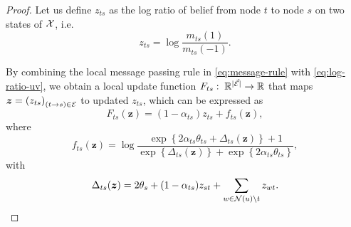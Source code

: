 \begin{proof}
  Let us define $z_{ts}$ as the log ratio of belief from node $t$ to node $s$ on two states of $\mathcal{X}$, i.e.
  \begin{equation}\label{eq:log-ratio-uv}
    z_{ts} = \log\frac{m_{ts}(1)}{m_{ts}(-1)}.
  \end{equation}

  By combining the local message passing rule in \eqref{eq:message-rule} with \eqref{eq:log-ratio-uv}, we obtain a local update function $F_{ts}: \; \mathbb{R}^{| \vec{\mathcal{E}} |} \rightarrow \mathbb{R}$ that maps $\bm{z} = \left( z_{ts} \right)_{(t \rightarrow s) \in \mathcal{E}}$ to updated $z_{ts}$, which can be expressed as
  \begin{equation}\label{eq:ratio-update}
    F_{ts}(\bm{z}) = (1-\alpha_{ts}) z_{ts} + f_{ts}(\bm{z}),
  \end{equation}
  where
  \begin{equation}
    f_{ts}(\bm{z}) = \log\frac{\exp\left\{ 2 \alpha_{ts} \theta_{ts} + \Delta_{ts}(\bm{z}) \right\}+1}
    {\exp\left\{ \Delta_{ts}(\bm{z}) \right\} +
      \exp\left\{ 2 \alpha_{ts} \theta_{ts} \right\}},
  \end{equation}
  with
  \begin{equation}
    \Delta_{ts}(\bm{z}) = 2 \theta_s + (1 - \alpha_{ts}) z_{st} + \sum_{w\in \mathcal{N}(u)\backslash t} z_{wt}.
  \end{equation}


\end{proof}
